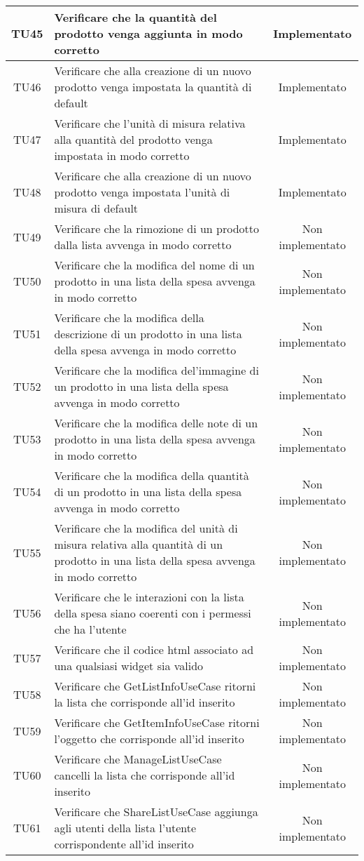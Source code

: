 \begin{center}
\begin{longtable}{|c|>{\centering}m{10cm}|c|}
		TU45 & Verificare che la quantità del prodotto venga aggiunta in modo corretto & Implementato \\ \hline
		TU46 & Verificare che alla creazione di un nuovo prodotto venga impostata la quantità di default & Implementato \\ \hline
		TU47 & Verificare che l'unità di misura relativa alla quantità del prodotto venga impostata in modo corretto & Implementato \\ \hline
		TU48 & Verificare che alla creazione di un nuovo prodotto venga impostata l'unità di misura di default & Implementato \\ \hline
		TU49 & Verificare che la rimozione di un prodotto dalla lista avvenga in modo corretto & Non implementato \\ \hline
		TU50 & Verificare che la modifica del nome di un prodotto in una lista della spesa avvenga in modo corretto & Non implementato \\ \hline
		TU51 & Verificare che la modifica della descrizione di un prodotto in una lista della spesa avvenga in modo corretto & Non implementato \\ \hline
		TU52 & Verificare che la modifica del'immagine di un prodotto in una lista della spesa avvenga in modo corretto & Non implementato \\ \hline
		TU53 & Verificare che la modifica delle note di un prodotto in una lista della spesa avvenga in modo corretto & Non implementato \\ \hline
		TU54 & Verificare che la modifica della quantità di un prodotto in una lista della spesa avvenga in modo corretto & Non implementato \\ \hline
		TU55 & Verificare che la modifica del unità di misura relativa alla quantità di un prodotto in una lista della spesa avvenga in modo corretto & Non implementato \\ \hline
		TU56 & Verificare che le interazioni con la lista della spesa siano coerenti con i permessi che ha l'utente & Non implementato \\ \hline
		TU57 & Verificare che il codice html associato ad una qualsiasi widget sia valido & Non implementato \\ \hline
		TU58 & Verificare che GetListInfoUseCase ritorni la lista che corrisponde all'id inserito & Non implementato \\ \hline
		TU59 & Verificare che GetItemInfoUseCase ritorni l'oggetto che corrisponde all'id inserito & Non implementato \\ \hline
		TU60 & Verificare che ManageListUseCase cancelli la lista che corrisponde all'id inserito & Non implementato \\ \hline
		TU61 & Verificare che ShareListUseCase aggiunga agli utenti della lista l'utente corrispondente all'id inserito & Non implementato \\ \hline
	\end{longtable}
\end{center}
